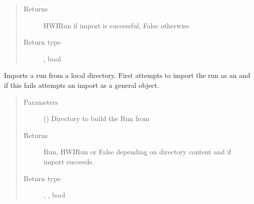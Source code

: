 \documentclass[letterpaper,10pt,english]{sphinxmanual}
\begin{document}
\begin{fulllineitems}
\begin{fulllineitems}
\begin{quote}
\begin{description}
\item[{Returns}] \leavevmode
HWIRun if import is successful, False otherwise

\item[{Return type}] \leavevmode
{\hyperref[\detokenize{polo.crystallography:polo.crystallography.run.HWIRun}]{}}, bool

\end{description}\end{quote}

\end{fulllineitems}


\begin{fulllineitems}
\label{\detokenize{polo.utils:polo.utils.io_utils.RunImporter.import_run_from_directory}}
Imports a run from a local directory. First attempts to import
the run as an  and if this fails attempts an import as
a general  object.
\begin{quote}\begin{description}
\item[{Parameters}] \leavevmode
{} () \textendash{} Directory to build the Run from

\item[{Returns}] \leavevmode
Run, HWIRun or False depending on directory content
and if import succeeds.

\item[{Return type}] \leavevmode
{\hyperref[\detokenize{polo.crystallography:polo.crystallography.run.Run}]{}}, {\hyperref[\detokenize{polo.crystallography:polo.crystallography.run.HWIRun}]{}}, bool

\end{description}\end{quote}

\end{fulllineitems}


\end{fulllineitems}
\end{document}
